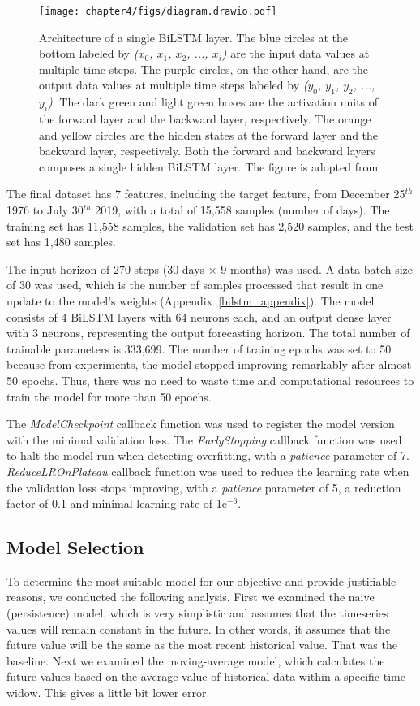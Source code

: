 \begin{figure}[htp]
    \centerline{\texttt{[image: chapter4/figs/diagram.drawio.pdf]}}
    \caption{Architecture of a single BiLSTM layer. The blue circles at the bottom labeled by \textit{($x_0$, $x_1$, $x_2$, ..., $x_i$)} are the input data values at multiple time steps. The purple circles, on the other hand, are the output data values at multiple time steps labeled by \textit{($y_0$, $y_1$, $y_2$, ..., $y_i$)}. The dark green and light green boxes are the activation units of the forward layer and the backward layer, respectively. The orange and yellow circles are the hidden states at the forward layer and the backward layer, respectively. Both the forward and backward layers composes a single hidden BiLSTM layer. The figure is adopted from \citet{olah_2015}}
\label{fig_model}
\end{figure}

The final dataset has 7 features, including the target feature, from December 25$^{th}$ 1976 to July 30$^{th}$ 2019, with a total of 15,558 samples (number of days). The training set has 11,558 samples, the validation set has 2,520 samples, and the test set has 1,480 samples.

The input horizon of 270 steps (30 days × 9 months) was used.
A data batch size of 30 was used, which is the number of samples processed that result in one update to the model's weights (Appendix~\ref{bilstm_appendix}).
The model consists of 4 BiLSTM layers with 64 neurons each, and an output dense layer with 3 neurons, representing the output forecasting horizon.
The total number of trainable parameters is 333,699.
The number of training epochs was set to 50 because from experiments, the model stopped improving remarkably after almost 50 epochs. Thus, there was no need to waste time and computational resources to train the model for more than 50 epochs.

The \textit{ModelCheckpoint} callback function was used to register the model version with the minimal validation loss. 
The \textit{EarlyStopping} callback function was used to halt the model run when detecting overfitting, with a \textit{patience} parameter of 7. 
\textit{ReduceLROnPlateau} callback function was used to reduce the learning rate when the validation loss stops improving, with a \textit{patience} parameter of 5, a reduction factor of 0.1 and minimal learning rate of 1e$^{-6}$.
\subsection{Model Selection}
To determine the most suitable model for our objective and provide justifiable reasons, we conducted the following analysis.
First we examined the naive (persistence) model, which is very simplistic and assumes that the timeseries values will remain constant in the future. In other words, it assumes that the future value will be the same as the most recent historical value. That was the baseline. Next we examined the moving-average model, which calculates the future values based on the average value of historical data within a specific time widow. This gives a little bit lower error.

